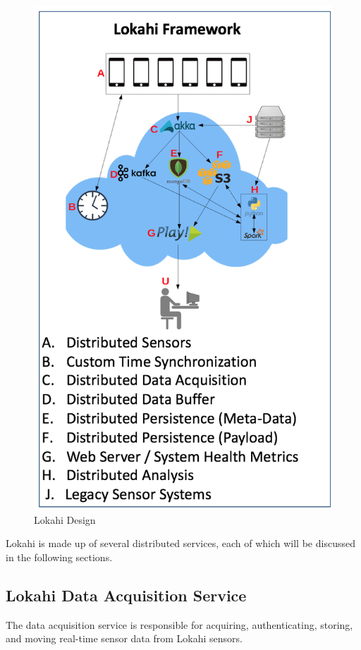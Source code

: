 \begin{figure}
	\centering
	\includegraphics[]{figures/lokahi.png}
	\caption{Lokahi Design}\label{fig:lokahi}
\end{figure}

Lokahi is made up of several distributed services, each of which will be discussed in the following sections.

\subsection{Lokahi Data Acquisition Service}\label{subsec:lokahi-data-acquisition-service}
The data acquisition service is responsible for acquiring, authenticating, storing, and moving real-time sensor data from Lokahi sensors.

